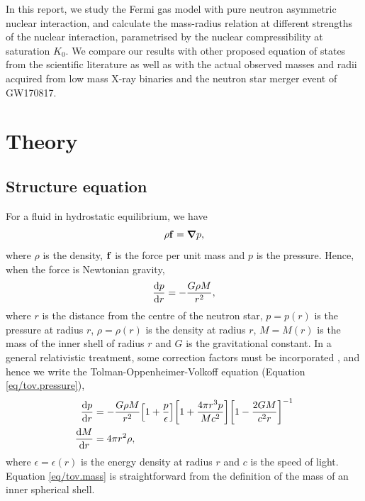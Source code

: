 \documentclass[draft,11pt]{article}
\theoremstyle{definition}
\theoremstyle{remark}
\renewcommand{\vec}[1]{\vb{#1}}
\begin{document}
        In this report, we study the Fermi gas model with pure neutron asymmetric nuclear interaction, and calculate the mass-radius relation at different strengths of the nuclear interaction, parametrised by the nuclear compressibility at saturation $K_{0}$. We compare our results with other proposed equation of states from the scientific literature as well as with the actual observed masses and radii acquired from low mass X-ray binaries and the neutron star merger event of GW170817.
    
    \section{Theory}
        \subsection{Structure equation}
            For a fluid in hydrostatic equilibrium, we have \[\rho\vec{f}=\grad{p},\] where $\rho$ is the density, $\vec{f}$ is the force per unit mass and $p$ is the pressure. Hence, when the force is Newtonian gravity, \[\dv{p}{r}=-\frac{G\rho M}{r^{2}},\] where $r$ is the distance from the centre of the neutron star, $p=p(r)$ is the pressure at radius $r$, $\rho=\rho(r)$ is the density at radius $r$, $M=M(r)$ is the mass of the inner shell of radius $r$ and $G$ is the gravitational constant. In a general relativistic treatment, some correction factors must be incorporated \parencite{silbar.reddy.2004/neutron.stars}, and hence we write the Tolman-Oppenheimer-Volkoff equation (Equation \ref{eq/tov.pressure}),
            \begin{align}
                \label{eq/tov.pressure}\dv{p}{r}&=-\frac{G\rho M}{r^{2}}\qty[1+\frac{p}{\epsilon}]\qty[1+\frac{4\pi r^{3}p}{Mc^{2}}]\qty[1-\frac{2GM}{c^{2}r}]^{-1}\\
                \label{eq/tov.mass}\dv{M}{r}&=4\pi r^{2}\rho,
            \end{align}
            where $\epsilon=\epsilon(r)$ is the energy density at radius $r$ and $c$ is the speed of light. Equation \ref{eq/tov.mass} is straightforward from the definition of the mass of an inner spherical shell.

            
\end{document}
